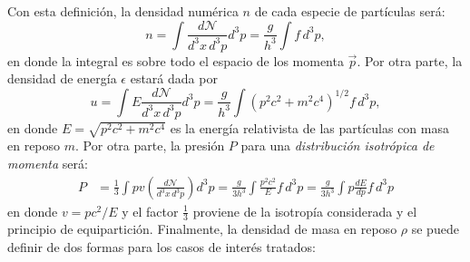 Con esta definición, la densidad numérica $n$ de cada especie de partículas será:
\begin{equation}\label{densidad_dist}
 n=\int\frac{d\mathcal{N}}{d^3x\,d^3p}d^3p=\frac{g}{h^3}\int f\,d^3p,
\end{equation}
en donde la integral es sobre todo el espacio de los momenta $\vec{p}$. Por otra parte, la densidad de energía $\epsilon$ estará dada por
\begin{equation}\label{energia_dist}
 u=\int E\frac{d\mathcal{N}}{d^3x\,d^3p}d^3p=\frac{g}{h^3}\int \left(p^2c^2+m^2c^4\right)^{1/2}f\,d^3p,
\end{equation}
en donde $E=\sqrt{p^2 c^2+m^2 c^4}$ es la energía relativista de las partículas con masa en reposo $m$. Por otra parte, la presión $P$ para una \textit{distribución isotrópica de momenta} será:
\begin{align}
 P&=\frac{1}{3}\int pv\left(\frac{d\mathcal{N}}{d^3x\,d^3p}\right)d^3p=\frac{g}{3h^3}\int \frac{p^2c^2}{E}f\,d^3p
 =\frac{g}{3h^3}\int p\frac{dE}{dp}f\,d^3p\label{presion_dist2}
\end{align}
en donde $v=pc^2/E$ y el factor $\frac{1}{3}$ proviene de la isotropía considerada y el principio de equipartición. Finalmente, la densidad de masa en reposo $\rho$ se puede definir de dos formas para los casos de interés tratados:
